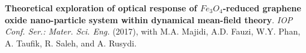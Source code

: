 \documentclass[10pt,letterpaper]{article}
\begin{document}
\textbf{Theoretical exploration of optical response of $Fe_{3}O_{4}$-reduced graphene oxide nano-particle system within dynamical mean-field theory}. \textit{IOP Conf. Ser.: Mater. Sci. Eng.} (2017), with M.A. Majidi, A.D. Fauzi, W.Y. Phan, A. Taufik, R. Saleh, and A. Rusydi.
\end{document}
